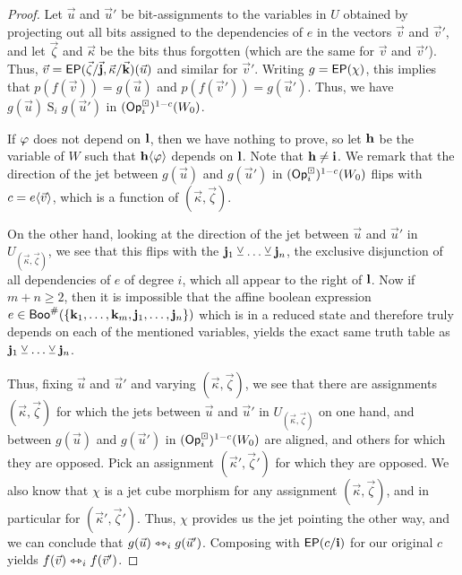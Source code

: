 \documentclass[a4paper]{article}
\begin{document}
\begin{proof}
	Let $\vec u$ and $\vec u'$ be bit-assignments to the variables in $U$ obtained by projecting out all bits assigned to the dependencies of $e$ in the vectors $\vec v$ and $\vec v'$, and let $\vec \zeta$ and $\vec \kappa$ be the bits thus forgotten (which are the same for $\vec v$ and $\vec v'$).
	Thus, $\vec v = \mathsf{EP}(\vec \zeta/\vec{\mathbf{j}}, \vec \kappa/\vec{\mathbf{k}})(\vec u)$ and similar for $\vec v'$.
	Writing $g = \mathsf{EP}(\chi)$, this implies that $p(f(\vec v)) = g(\vec u)$ and $p(f(\vec v')) = g(\vec u')$.
	Thus, we have $g(\vec u) \mathrel S_i g(\vec u')$ in $({\mathsf{Op}}^\boxdot_i)^{1-c}(W_0)$.
	
	If $\varphi$ does not depend on $\mathbf{l}$, then we have nothing to prove,
	so let $\mathbf{h}$ be the variable of $W$ such that $\mathbf{h} \langle \varphi \rangle$ depends on $\mathbf{l}$. Note that $\mathbf{h} \neq \mathbf{i}$.
	We remark that the direction of the jet between $g(\vec u)$ and $g(\vec u')$ in $({\mathsf{Op}}^\boxdot_i)^{1-c}(W_0)$ flips with $c = e \langle \vec v \rangle$, which is a function of $(\vec \kappa, \vec \zeta)$.
	
	On the other hand, looking at the direction of the jet between $\vec u$ and $\vec u'$ in $U_{(\vec \kappa, \vec \zeta)}$, we see that this flips with the $\mathbf{j}_1 \veebar \ldots \veebar \mathbf{j}_n$, the exclusive disjunction of all dependencies of $e$ of degree $i$, which all appear to the right of $\mathbf{l}$.
	Now if $m+n \geq 2$, then it is impossible that the affine boolean expression $e \in \mathsf{Boo}^\#(\mathopen{}\left\{ \mathbf{k}_1, \ldots, \mathbf{k}_m, \mathbf{j}_1, \ldots, \mathbf{j}_n \right\}\mathclose{})$ which is in a reduced state and therefore truly depends on each of the mentioned variables, yields the exact same truth table as $\mathbf{j}_1 \veebar \ldots \veebar \mathbf{j}_n$.
	
	Thus, fixing $\vec u$ and $\vec u'$ and varying $(\vec \kappa, \vec \zeta)$, we see that there are assignments $(\vec \kappa, \vec \zeta)$ for which the jets between $\vec u$ and $\vec u'$ in $U_{(\vec \kappa, \vec \zeta)}$ on one hand, and between $g(\vec u)$ and $g(\vec u')$ in $({\mathsf{Op}}^\boxdot_i)^{1-c}(W_0)$ are aligned, and others for which they are opposed.
	Pick an assignment $(\vec \kappa', \vec \zeta')$ for which they are opposed.
	We also know that $\chi$ is a jet cube morphism for any assignment $(\vec \kappa, \vec \zeta)$, and in particular for $(\vec \kappa', \vec \zeta')$.
	Thus, $\chi$ provides us the jet pointing the other way, and we can conclude that $g(\vec u) \leftrightarrowtriangle_i g(\vec u')$.
	Composing with $\mathsf{EP}(c/\mathbf{i})$ for our original $c$ yields $f(\vec v) \leftrightarrowtriangle_i f(\vec v')$.
\end{proof}
\end{document}

